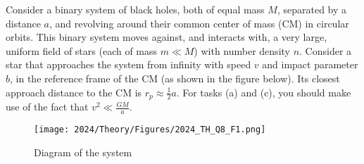 Consider a binary system of black holes, both of equal mass $M$, separated by a distance $a$, and revolving around their common center of mass (CM) in circular orbits. This binary system moves against, and interacts with, a very large, uniform field of stars (each of mass $m \ll M$) with number density $n$. Consider a star that approaches the system from infinity with speed $v$ and impact parameter $b$, in the reference frame of the CM (as shown in the figure below). Its closest approach distance to the CM is $r_p \approx \frac{1}{2}a$. For tasks (a) and (c), you should make use of the fact that $v^2 \ll \frac{GM}{a}$.


\begin{figure}[h!]
    \centering    
    \texttt{[image: 2024/Theory/Figures/2024\_TH\_Q8\_F1.png]}
    \caption{Diagram of the system}
    \label{fig:binary1}
\end{figure}

